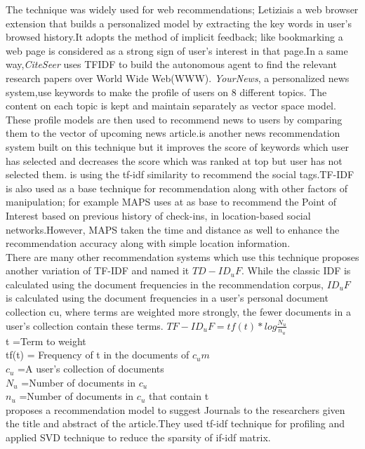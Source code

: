 The technique was widely used for web recommendations; Letizia\cite{Lieberman95letizia}is a web browser extension that builds a personalized model by extracting the key words in user's browsed history.It adopts the method of implicit feedback; like bookmarking a web page is considered as a strong sign of user's interest in that page.In a same way,\textit{CiteSeer}\cite{N52} uses TFIDF to build the autonomous agent to find the relevant research papers over World Wide Web(WWW).  \textit{YourNews}\cite{49Ahn}, a personalized news system,use keywords to make the profile of users on 8 different topics. The content on each topic is kept and maintain separately as vector space model. These profile models are then used to recommend news to users by comparing them to the vector of upcoming news article.\cite{N55}is another news recommendation system built on this technique but it improves the score of keywords which user has selected and decreases the score which was ranked at top but user has not selected them.\cite{N50} is using the tf-idf similarity to recommend the social tags.TF-IDF is also used as a base technique for recommendation along with other factors of manipulation; for example MAPS\cite{N51} uses at as base to recommend the Point of Interest based on previous history of check-ins, in location-based social networks.However, MAPS taken the time and distance as well to enhance the recommendation accuracy along with simple location information.
\\There are many other recommendation systems which use this technique \cite{N56} proposes another variation of TF-IDF and named it $TD-ID_uF$. While the classic IDF is calculated using the document frequencies in the recommendation corpus, $ID_uF$ is calculated using the document frequencies in a user’s personal document collection cu, where terms are weighted more strongly, the fewer documents in a user’s collection contain these terms.
\newline
$TF-ID_uF = tf(t)*log\frac{N_u}{n_u}$
\\t         =Term to weight
\\tf(t)    = Frequency of t in the documents of $c_um$ 
\\$c_u$     =A user’s collection of documents
\\$N_u$      =Number of documents in $c_u$
\\$n_u$     =Number of documents in $c_u$ that contain t
\newline
\\
\cite{N22}proposes a recommendation model to suggest Journals to the researchers given the title and abstract of the article.They used tf-idf technique for profiling and applied SVD technique to reduce the sparsity of if-idf matrix.
